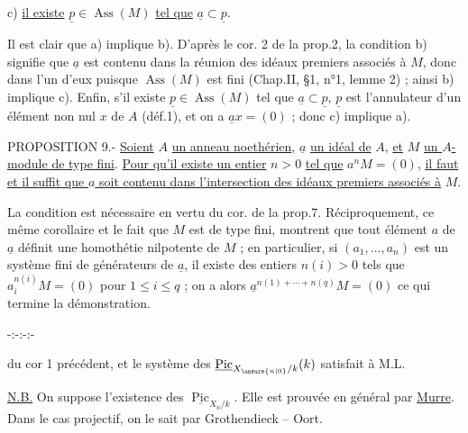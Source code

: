 c) \uline{il existe} $\underline p\in\operatorname{Ass}(M)$ \uline{tel que} $\underline a\subset\underline p$.

Il est clair que a) implique b). D'après le cor. 2 de la prop.2, la condition b) signifie que $\underline a$ est contenu dans la réunion des idéaux premiers associés à $M$, donc dans l'un d'eux puisque $\operatorname{Ass}(M)$ est fini (Chap.II, §1, n°1, lemme 2) ; ainsi b) implique c). Enfin, s'il existe $\underline p\in\operatorname{Ass}(M)$ tel que $\underline a\subset\underline p$, $\underline p$ est l'annulateur d'un élément non nul $x$ de $A$ (déf.1), et on a $\underline ax=(0)$ ; donc c) implique a).

PROPOSITION 9.- \uline{Soient} $A$ \uline{un anneau noethérien}, $\underline a$ \uline{un idéal de} $A$, \uline{et} $M$ \uline{un $A$-module de type fini}. \uline{Pour qu'il existe un entier} $n>0$ \uline{tel que} $a^nM=(0)$, \uline{il faut et il suffit que $a$ soit contenu dans l'intersection des idéaux premiers associés à} $M$.

La condition est nécessaire en vertu du cor. de la prop.7. Réciproquement, ce même corollaire et le fait que $M$ est de type fini, montrent que tout élément $a$ de $\underline a$ définit une homothétie nilpotente de $M$ ; en particulier, si $(a_1,\ldots,a_n)$ est un système fini de générateurs de $\underline a$, il existe des entiers $n(i)>0$ tels que $a_i^{n(i)}M=(0)$ pour $1\leq i\leq q$ ; on a alors $\underline a^{n(1)+\cdots+n(q)}M=(0)$ ce qui termine la démonstration.

\begin{center}-:-:-:-\end{center}



du cor 1 précédent, et le système des $\underline{\operatorname{Pic}}_{X_{\unsure{n|0}}/k}(k)$ satisfait à M.L.


\uline{N.B.} On suppose l'existence des $\underline{\operatorname{Pic}}_{X_n/k}$. Elle est prouvée en général par \uline{Murre}. Dans le cas projectif, on le sait par Grothendieck -- Oort.

